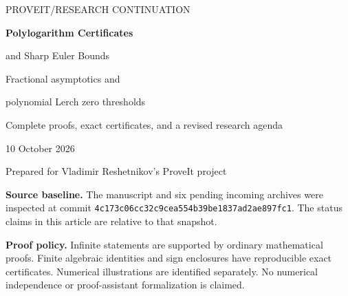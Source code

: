 \documentclass[11pt,a4paper]{article}
\numberwithin{equation}{section}
\theoremstyle{definition}
\theoremstyle{remark}
\begin{document}
\hypersetup{pageanchor=false}
\begin{titlepage}
\vspace*{18mm}
{\large\color{teal}\sffamily PROVEIT\quad /\quad RESEARCH CONTINUATION\par}
\vspace{12mm}
{\LARGE\bfseries\color{deepblue}Polylogarithm Certificates\par
\vspace{3mm}and Sharp Euler Bounds\par}
\vspace{6mm}
{\Large\color{deepblue}Fractional asymptotics and\par
\vspace{2mm}polynomial Lerch zero thresholds\par}
\vspace{12mm}
{\large Complete proofs, exact certificates, and a revised research agenda\par}
\vspace{12mm}
{\large 10 October 2026\par}
\vspace{6mm}
{\normalsize Prepared for Vladimir Reshetnikov's ProveIt project\par}
\vfill
\begin{minipage}{0.95\textwidth}
\textbf{Source baseline.} The manuscript and six pending incoming archives
were inspected at commit
\texttt{4c173c06cc32c9cea554b39be1837ad2ae897fc1}.
The status claims in this article are relative to that snapshot.
\medskip

\textbf{Proof policy.} Infinite statements are supported by ordinary
mathematical proofs. Finite algebraic identities and sign enclosures
have reproducible exact certificates. Numerical illustrations are
identified separately. No numerical independence or proof-assistant
formalization is claimed.
\end{minipage}
\end{titlepage}
\hypersetup{pageanchor=true}


\tableofcontents
\clearpage
{}








\end{document}
